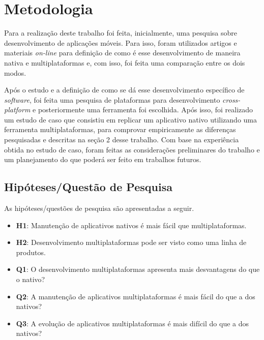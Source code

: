 \chapter{Metodologia} \label{metodologia}
Para a realização deste trabalho foi feita, inicialmente, uma pesquisa sobre desenvolvimento de aplicações móveis. 
Para isso, foram utilizados artigos e materiais \textit{on-line} para definição de como é esse desenvolvimento
de maneira nativa e multiplataformas e, com isso, foi feita uma comparação entre os dois modos. 


Após o estudo e a definição de como se dá esse desenvolvimento específico de \textit{software},
foi feita uma pesquisa de plataformas para desenvolvimento \textit{cross-platform} e posteriormente uma ferramenta foi escolhida. Após isso, foi realizado um estudo de caso que
consistiu em replicar um aplicativo nativo utilizando uma ferramenta multiplataformas, para comprovar empiricamente as diferenças pesquisadas e descritas na seção 2 desse trabalho. 
Com base na experiência obtida no estudo de caso, foram feitas as considerações preliminares
do trabalho e um planejamento do que poderá ser feito em trabalhos futuros.
\section{Hipóteses/Questão de Pesquisa} \label{subsec:hipoteses}

As hipóteses/questões de pesquisa são apresentadas a seguir.

\begin{itemize}
    \item \textbf{H1}: Manutenção de aplicativos nativos é mais fácil que multiplataformas.
    \item \textbf{H2}: Desenvolvimento multiplataformas pode ser visto como uma linha de produtos.
    \item \textbf{Q1}: O desenvolvimento multiplataformas apresenta mais desvantagens do que o nativo?
    \item \textbf{Q2}: A manutenção de aplicativos multiplataformas é mais fácil do que a dos nativos?
    \item \textbf{Q3}: A evolução de aplicativos multiplataformas é mais difícil do que a dos nativos? 
\end{itemize}

